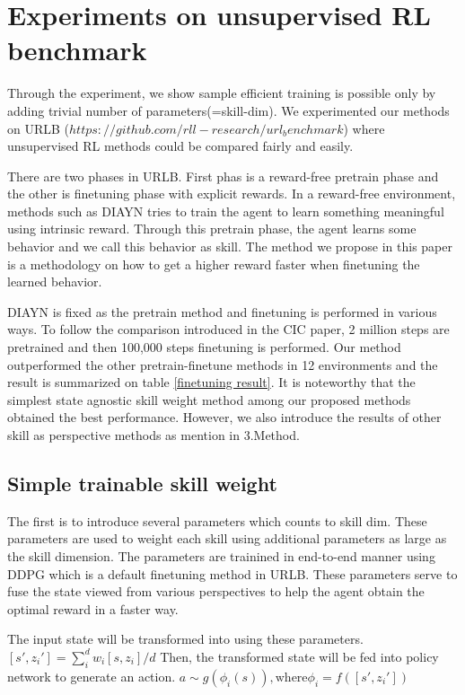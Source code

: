 \section{Experiments on unsupervised RL benchmark}

Through the experiment, we show sample efficient training is possible only by adding trivial number of parameters(=skill-dim).
We experimented our methods on URLB ($https://github.com/rll-research/url_benchmark$) where unsupervised RL methods could be compared fairly and easily.

There are two phases in URLB.
First phas is a reward-free pretrain phase and the other is finetuning phase with explicit rewards.
In a reward-free environment, methods such as DIAYN tries to train the agent to learn something meaningful using intrinsic reward.
Through this pretrain phase, the agent learns some behavior and we call this behavior as skill.
The method we propose in this paper is a methodology on how to get a higher reward faster when finetuning the learned behavior.

DIAYN is fixed as the pretrain method and finetuning is performed in various ways.
To follow the comparison introduced in the CIC paper, 2 million steps are pretrained and then 100,000 steps finetuning is performed.
Our method outperformed the other pretrain-finetune methods in 12 environments and the result is summarized on table \cref{finetuning result}.
It is noteworthy that the simplest state agnostic skill weight method among our proposed methods obtained the best performance. 
However, we also introduce the results of other skill as perspective methods as mention in 3.Method.

\subsection{Simple trainable skill weight}
The first is to introduce several parameters which counts to skill dim.
These parameters are used to weight each skill using additional parameters as large as the skill dimension.
The parameters are trainined in end-to-end manner using DDPG which is a default finetuning method in URLB.
These parameters serve to fuse the state viewed from various perspectives to help the agent obtain the optimal reward in a faster way.

The input state will be transformed into using these parameters. 
$[s',z_i'] = \sum_{i}^{d}w_i [s,z_i]/d$
Then, the transformed state will be fed into policy network to generate an action.
$a \sim g(\phi_i(s)), \text{where} \phi_i=f([s',z_i'])$

